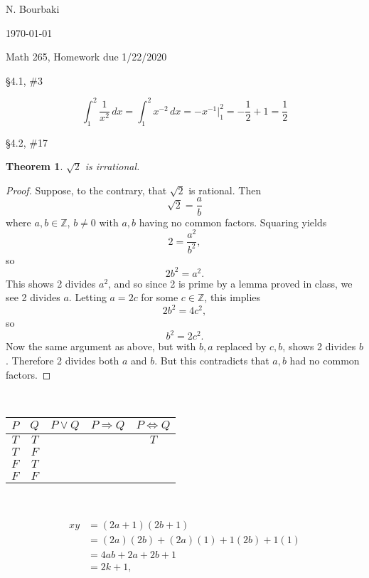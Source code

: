 \documentclass[11pt]{report}
\theoremstyle{plain}
\newtheorem{thm}{Theorem}
\begin{document}
\hfill N. Bourbaki

\hfill \today

\begin{center}
Math 265, Homework due 1/22/2020
\end{center}
\begin{description}
\item{\S 4.1, \#3}

$$\int_1^2 \frac 1 {x^2} \, dx=\int_1^2 x^{-2} \, dx=-x^{-1} \Big |_1^2=-\frac 12+1=\frac 12$$

\item{\S 4.2, \#17}

\begin{thm} $\sqrt 2$ is irrational.
\end{thm}
\begin{proof}
Suppose, to the contrary, that $\sqrt 2$ is rational. Then
$$\sqrt 2=\frac ab$$
where $a,b\in \mathbb Z$, $b\not = 0$ with $a,b$ having no common factors. Squaring yields
$$2=\frac {a^2}{b^2},$$
so
$$2b^2=a^2.$$
This shows 2 divides $a^2$, and so since 2 is prime by a lemma proved in class, we see 2 divides $a$. Letting $a=2c$ for some $c\in \mathbb Z$, this implies
$$2b^2=4c^2,$$ so
$$b^2=2c^2.$$
Now the same argument as above, but with $b,a$ replaced by $c,b$, shows 2 divides $b$. Therefore 2 divides both $a$ and $b$. But this contradicts that $a,b$ had no common factors.
\end{proof}


\item[\S 99.99, \#99]

\ 

\begin{tabular}{c|c|c|c|c}

$P$ & $Q$ & $P\lor Q$ & $P\Rightarrow Q$ & $P \iff Q$ \\
\hline
$T$  & $T$ & & & $T$ \\
$T$  & $F$ & & & \\
$F$  & $T$ & & & \\
$F$  & $F$ & & & \\
\end{tabular}

\ 

\item[An example of aligned equations:]


\begin{align*}
xy&=(2a+1)(2b+1)\\
&=(2a)(2b)+(2a)(1)+1(2b)+1(1)\\
&=4ab+2a+2b+1\\
&=2k+1,
\end{align*}

\end{description}
\end{document}
